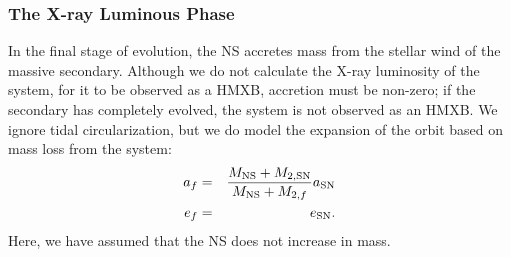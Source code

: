 \documentclass[usenatbib]{mnras}
\begin{document}
\subsubsection{The X-ray Luminous Phase} \label{sec:trans_XRB}

In the final stage of evolution, the NS accretes mass from the stellar wind of the massive secondary. Although we do not calculate the X-ray luminosity of the system, for it to be observed as a HMXB, accretion must be non-zero; if the secondary has completely evolved, the system is not observed as an HMXB. We ignore tidal circularization, but we do model the expansion of the orbit based on mass loss from the system:
\begin{eqnarray}
a_f &=& \frac{M_{\rm NS} + M_{\rm 2, SN}}{M_{\rm NS} + M_{2,f}} a_{\rm SN} \\
e_f &=& e_{\rm SN}.
\end{eqnarray}
Here, we have assumed that the NS does not increase in mass.
\end{document}
